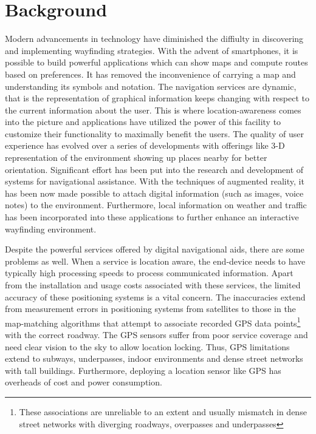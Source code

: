 \documentclass{iitkthesis}
\begin{document}
\section{Background}
Modern advancements in technology have diminished the diffiulty 
in discovering and implementing wayfinding strategies. With the 
advent of smartphones, it is possible to build powerful 
applications which can show maps and compute routes based on preferences. 
It has removed the inconvenience of carrying a map and understanding its 
symbols and notation. The navigation services are dynamic, that is the 
representation of graphical information keeps changing with respect to 
the current information about the user. This is where location-awareness 
comes into the picture and applications have utilized the power of this 
facility to customize their functionality to maximally benefit the users. 
The quality of user experience has evolved over a series of developments 
with offerings like 3-D representation of the environment showing up 
places nearby for better orientation. Significant effort has been put 
into the research and development of systems for navigational 
assistance. With the techniques of augmented reality, it has been now 
made possible to attach digital information (such as images, voice notes) 
to the environment. Furthermore, local information on weather and traffic 
has been incorporated into these applications to further enhance an 
interactive wayfinding environment.

Despite the powerful services offered by digital navigational aids, there 
are some problems as well. When a service is location aware, 
the end-device needs to have typically high processing speeds to process 
communicated information. Apart from 
the installation and usage costs associated with these services, the 
limited accuracy of these positioning systems is a vital concern. The 
inaccuracies extend from measurement errors in positioning systems from 
satellites to those in the map-matching algorithms \cite{white2000} that 
attempt to associate recorded GPS data points\footnote{These associations 
are unreliable to an extent and usually mismatch in dense street networks 
with diverging roadways, overpasses and underpasses} with the correct 
roadway. The GPS sensors suffer from poor service coverage and need clear 
vision to the sky to allow location locking. Thus, GPS limitations extend 
to subways, underpasses, indoor environments and dense street networks 
with tall buildings. Furthermore, deploying a location sensor like GPS 
has overheads of cost and power consumption.
\end{document}
